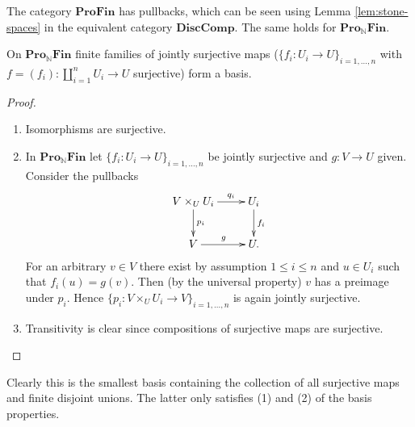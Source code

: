 \documentclass{notes}
\def\Profin{\mathbf{ProFin}}
\def\Lightprofin{\mathbf{Pro_{\mathbb{N}}Fin}}
\def\Disccomp{\mathbf{DiscComp}}
\begin{document}
{	The category $\Profin$ has pullbacks, which can be seen using Lemma \ref{lem:stone-spaces} in the equivalent category $\Disccomp$.
	The same holds for $\Lightprofin$.
	
	\begin{prop}
		On $\Lightprofin$ finite families of jointly surjective maps ($\{f_i : U_i \rightarrow U\}_{i = 1,\dots,n}$  with $f = (f_i) : \coprod_{i=1}^n U_i \rightarrow U$ surjective) form a basis.
	\end{prop}
	
	\begin{proof}
		\begin{enumerate}
			\item Isomorphisms are surjective.
			\item In $\Lightprofin$ let $\{f_i : U_i \rightarrow U\}_{i = 1,\dots,n}$ be jointly surjective and $g : V \rightarrow U$ given.
			Consider the pullbacks
			$$
			\xymatrix{
				V \times_U U_i \ar[d]^-{p_i} \ar[r]^-{q_i} & U_i \ar[d]^{f_i} \\
				V \ar[r]^g & U.
			}
			$$
			For an arbitrary $v \in V$ there exist by assumption $1 \leq i \leq n$ and $u \in U_i$ such that $f_i(u) = g(v)$.
			Then (by the universal property) $v$ has a preimage under $p_i$.
			Hence $\{p_i : V \times_U U_i \rightarrow V\}_{i = 1,\dots,n}$ is again jointly surjective.
			\item Transitivity is clear since compositions of surjective maps are surjective.
		\end{enumerate}
	\end{proof}
	
	\begin{remark}
		Clearly this is the smallest basis containing the collection of all surjective maps and finite disjoint unions.
		The latter only satisfies (1) and (2) of the basis properties.
	\end{remark}
}
\end{document}
